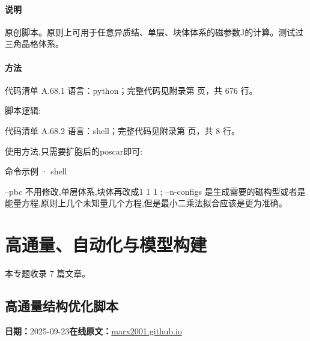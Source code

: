\documentclass[lang=cn,scheme=chinese,color=blue,device=normal,toc=onecol,math=cm]{elegantbook}
\begin{document}
\subsubsection{说明}


原创脚本。原则上可用于任意异质结、单层、块体体系的磁参数J的计算。测试过三角晶格体系。\par


\subsubsection{方法}


\begin{codeindexbox}{代码清单 A.68.1}
语言：python；完整代码见附录第 \pageref{code:68:1} 页，共 676 行。
\end{codeindexbox}


脚本逻辑:\par


\begin{codeindexbox}{代码清单 A.68.2}
语言：shell；完整代码见附录第 \pageref{code:68:2} 页，共 8 行。
\end{codeindexbox}


使用方法,只需要扩胞后的poscar即可:\par


\begin{inlinecodebox}{命令示例 · shell}
\end{inlinecodebox}


–pbc 不用修改,单层体系,块体再改成1 1 1 ; –n-configs 是生成需要的磁构型或者是能量方程,原则上几个未知量几个方程,但是最小二乘法拟合应该是更为准确。\par


\chapter{高通量、自动化与模型构建}
\begin{partbox}本专题收录 7 篇文章。\end{partbox}

\section{高通量结构优化脚本}
\begin{articlemeta}
\textbf{日期：}2025-09-23\hfill\textbf{在线原文：}\href{https://marx2001.github.io/sci-note\_posts/20250923-scripts/}{marx2001.github.io}
\end{articlemeta}
\end{document}
